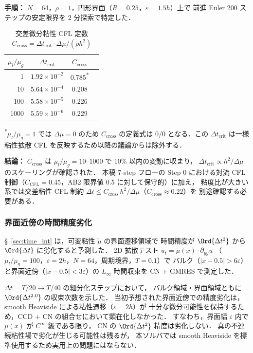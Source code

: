 \noindent\textbf{手順：}
$N = 64$，$\rho = 1$，円形界面（$R = 0.25$，$\varepsilon = 1.5h$）上で
前進 Euler 200 ステップの安定限界を 2 分探索で特定した．

\begin{table}[htbp]
\centering
\caption{交差微分粘性 CFL 定数 $C_{\mathrm{cross}} = \Delta t_{\mathrm{crit}} \cdot \Delta\mu / (\rho h^2)$}
\label{tab:cross_viscous_cfl}
\renewcommand{\arraystretch}{1.2}
\small
\begin{tabular}{rccc}
\toprule
$\mu_l / \mu_g$ & $\Delta t_{\mathrm{crit}}$ & $C_{\mathrm{cross}}$ \\
\midrule
    1 & $1.92 \times 10^{-2}$ & 0.785\textsuperscript{*} \\
   10 & $5.64 \times 10^{-4}$ & 0.208 \\
  100 & $5.58 \times 10^{-5}$ & 0.226 \\
 1000 & $5.59 \times 10^{-6}$ & 0.229 \\
\bottomrule
\end{tabular}
{\footnotesize \textsuperscript{*}$\mu_l/\mu_g = 1$ では $\Delta\mu = 0$ のため $C_{\mathrm{cross}}$ の定義式は $0/0$ となる．この $\Delta t_{\mathrm{crit}}$ は一様粘性拡散 CFL を反映するため以降の議論からは除外する．}
\end{table}

\noindent\textbf{結論：}
$C_{\mathrm{cross}}$ は $\mu_l/\mu_g = 10$--$1000$ で 10\% 以内の変動に収まり，
$\Delta t_{\mathrm{crit}} \propto h^2 / \Delta\mu$ のスケーリングが確認された．
本稿 7-step フローの Step 0 における対流 CFL 制御（$C_{\mathrm{CFL}} = 0.45$，AB2 限界値 0.5 に対して保守的）に加え，
粘度比が大きい系では交差粘性 CFL 制約
$\Delta t \le C_{\mathrm{cross}}\,h^2/\Delta\mu$（$C_{\mathrm{cross}} \approx 0.22$）を
別途確認する必要がある．

\subsubsection{界面近傍の時間精度劣化}
\label{sec:interface_temporal_degradation}

§~\ref{sec:time_int} は，可変粘性 $\tilde\mu$ の界面遷移領域で
時間精度が $\Ord{\Delta t^2}$ から $\Ord{\Delta t}$ に劣化すると予測した．
2D 拡散テスト
$u_t = \tilde\mu(x) \cdot \partial_{yy} u$
（$\mu_l/\mu_g = 100$，$\varepsilon = 2h$，$N = 64$，周期境界，$T = 0.1$）で
バルク（$|x - 0.5| > 6\varepsilon$）と界面近傍（$|x - 0.5| < 3\varepsilon$）の
$L_\infty$ 時間収束を CN + GMRES で測定した．

$\Delta t = T/20 \to T/40$ の細分化ステップにおいて，
バルク領域・界面領域ともに $\Ord{\Delta t^{2.0}}$ の収束次数を示した．
当初予想された界面近傍での精度劣化は，
smooth Heaviside による粘性遷移（$\varepsilon = 2h$）が
十分な微分可能性を保持するため，CCD + CN の組合せにおいて顕在化しなかった．
すなわち，界面幅 $\varepsilon$ 内で $\tilde\mu(x)$ が $C^\infty$ 級である限り，
CN の $\Ord{\Delta t^2}$ 精度は劣化しない．
真の不連続粘性場で劣化が生じる可能性は残るが，
本ソルバでは smooth Heaviside を標準使用するため実用上の問題にはならない．
